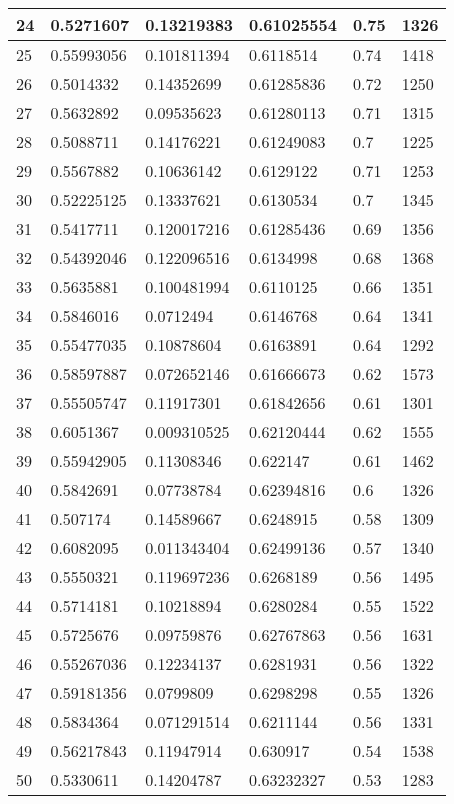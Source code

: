 \begin{longtable}{|l|l|l|l|l|l|}
24 & 0.5271607 & 0.13219383 & 0.61025554 & 0.75 & 1326 \\ \hline 
25 & 0.55993056 & 0.101811394 & 0.6118514 & 0.74 & 1418 \\ \hline 
26 & 0.5014332 & 0.14352699 & 0.61285836 & 0.72 & 1250 \\ \hline 
27 & 0.5632892 & 0.09535623 & 0.61280113 & 0.71 & 1315 \\ \hline 
28 & 0.5088711 & 0.14176221 & 0.61249083 & 0.7 & 1225 \\ \hline 
29 & 0.5567882 & 0.10636142 & 0.6129122 & 0.71 & 1253 \\ \hline 
30 & 0.52225125 & 0.13337621 & 0.6130534 & 0.7 & 1345 \\ \hline 
31 & 0.5417711 & 0.120017216 & 0.61285436 & 0.69 & 1356 \\ \hline 
32 & 0.54392046 & 0.122096516 & 0.6134998 & 0.68 & 1368 \\ \hline 
33 & 0.5635881 & 0.100481994 & 0.6110125 & 0.66 & 1351 \\ \hline 
34 & 0.5846016 & 0.0712494 & 0.6146768 & 0.64 & 1341 \\ \hline 
35 & 0.55477035 & 0.10878604 & 0.6163891 & 0.64 & 1292 \\ \hline 
36 & 0.58597887 & 0.072652146 & 0.61666673 & 0.62 & 1573 \\ \hline 
37 & 0.55505747 & 0.11917301 & 0.61842656 & 0.61 & 1301 \\ \hline 
38 & 0.6051367 & 0.009310525 & 0.62120444 & 0.62 & 1555 \\ \hline 
39 & 0.55942905 & 0.11308346 & 0.622147 & 0.61 & 1462 \\ \hline 
40 & 0.5842691 & 0.07738784 & 0.62394816 & 0.6 & 1326 \\ \hline 
41 & 0.507174 & 0.14589667 & 0.6248915 & 0.58 & 1309 \\ \hline 
42 & 0.6082095 & 0.011343404 & 0.62499136 & 0.57 & 1340 \\ \hline 
43 & 0.5550321 & 0.119697236 & 0.6268189 & 0.56 & 1495 \\ \hline 
44 & 0.5714181 & 0.10218894 & 0.6280284 & 0.55 & 1522 \\ \hline 
45 & 0.5725676 & 0.09759876 & 0.62767863 & 0.56 & 1631 \\ \hline 
46 & 0.55267036 & 0.12234137 & 0.6281931 & 0.56 & 1322 \\ \hline 
47 & 0.59181356 & 0.0799809 & 0.6298298 & 0.55 & 1326 \\ \hline 
48 & 0.5834364 & 0.071291514 & 0.6211144 & 0.56 & 1331 \\ \hline 
49 & 0.56217843 & 0.11947914 & 0.630917 & 0.54 & 1538 \\ \hline 
50 & 0.5330611 & 0.14204787 & 0.63232327 & 0.53 & 1283 \\ \hline 
\end{longtable}
